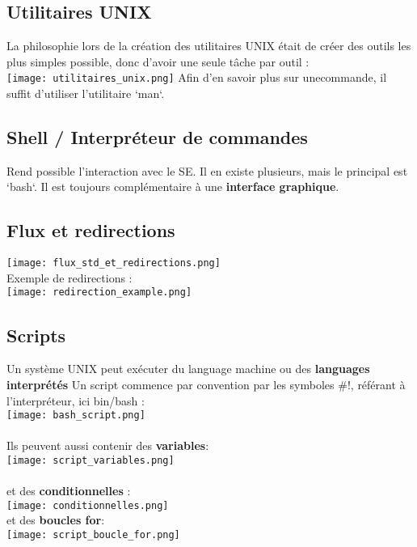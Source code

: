 \documentclass{article}
\begin{document}
        \subsection{Utilitaires UNIX}
            La philosophie lors de la création des utilitaires UNIX était
            de créer des outils les plus simples possible,
            donc d'avoir une seule tâche par outil :\\
            \texttt{[image: utilitaires\_unix.png]}
            Afin d'en savoir plus sur unecommande, il suffit d'utiliser l'utilitaire `man`.
        
        \subsection{Shell / Interpréteur de commandes}
            Rend possible l'interaction avec le SE.
            Il en existe plusieurs, mais le principal est `bash`.
            Il est toujours complémentaire à une \textbf{interface graphique}.
        
        \subsection{Flux et redirections}
            \texttt{[image: flux\_std\_et\_redirections.png]}\\
            Exemple de redirections :\\
            \texttt{[image: redirection\_example.png]}
        
            \subsection{Scripts}
                Un système UNIX peut exécuter du language machine ou des \textbf{languages interprétés}
                Un script commence par convention par les symboles $\#!$, référant à l'interpréteur, ici bin/bash :\\
                \texttt{[image: bash\_script.png]}\\\\
                Ils peuvent aussi contenir des \textbf{variables}:\\
                \texttt{[image: script\_variables.png]}\\\\
                et des \textbf{conditionnelles} :\\
                \texttt{[image: conditionnelles.png]}\\
                et des \textbf{boucles for}:\\
                \texttt{[image: script\_boucle\_for.png]}

    
\end{document}
